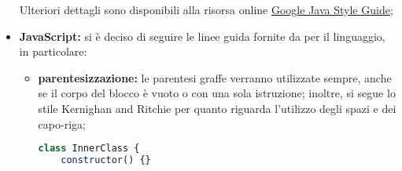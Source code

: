 \begin{itemize}
\begin{itemize}
							\end{itemize}
							Ulteriori dettagli sono disponibili alla risorsa online \href{https://google.github.io/styleguide/javaguide.html}{Google Java Style Guide};
						\item \textbf{JavaScript:} si è deciso di seguire le linee guida fornite da  per il linguaggio, in particolare:
							\begin{itemize}
								\item \textbf{parentesizzazione:} le parentesi graffe verranno utilizzate sempre, anche se il corpo del blocco è vuoto o con una sola istruzione; inoltre, si segue lo stile Kernighan and Ritchie per quanto riguarda l'utilizzo degli spazi e dei capo-riga;
								\begin{lstlisting}[language=JavaScript,captionpos=b,caption={Esempio per la sintassi JavaScript}]
class InnerClass {
	constructor() {}


\end{lstlisting}
\end{itemize}
\end{itemize}
